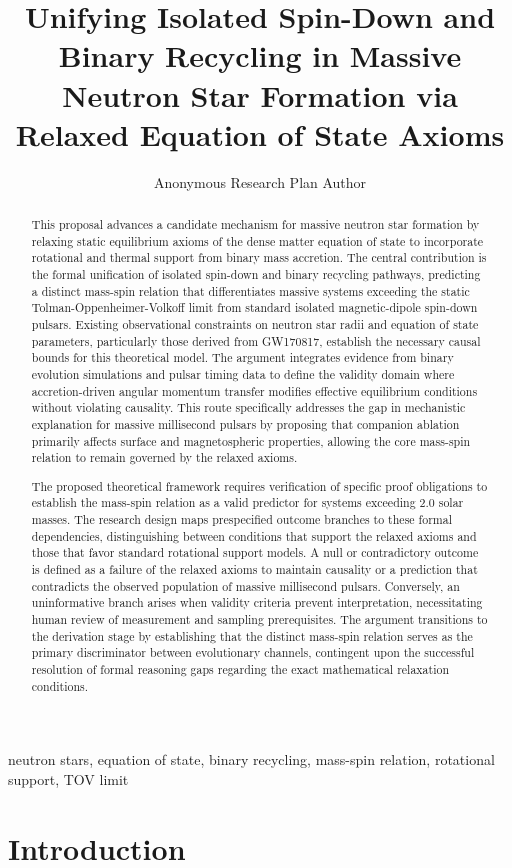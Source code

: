 \documentclass[conference]{IEEEtran}
\begin{document}
\title{Unifying Isolated Spin-Down and Binary Recycling in Massive Neutron Star Formation via Relaxed Equation of State Axioms}\author{Anonymous Research Plan Author}\maketitle

\begin{abstract}
This proposal advances a candidate mechanism for massive neutron star formation by relaxing static equilibrium axioms of the dense matter equation of state to incorporate rotational and thermal support from binary mass accretion. The central contribution is the formal unification of isolated spin-down and binary recycling pathways, predicting a distinct mass-spin relation that differentiates massive systems exceeding the static Tolman-Oppenheimer-Volkoff limit from standard isolated magnetic-dipole spin-down pulsars. Existing observational constraints on neutron star radii and equation of state parameters, particularly those derived from GW170817, establish the necessary causal bounds for this theoretical model. The argument integrates evidence from binary evolution simulations and pulsar timing data to define the validity domain where accretion-driven angular momentum transfer modifies effective equilibrium conditions without violating causality. This route specifically addresses the gap in mechanistic explanation for massive millisecond pulsars by proposing that companion ablation primarily affects surface and magnetospheric properties, allowing the core mass-spin relation to remain governed by the relaxed axioms.

The proposed theoretical framework requires verification of specific proof obligations to establish the mass-spin relation as a valid predictor for systems exceeding 2.0 solar masses. The research design maps prespecified outcome branches to these formal dependencies, distinguishing between conditions that support the relaxed axioms and those that favor standard rotational support models. A null or contradictory outcome is defined as a failure of the relaxed axioms to maintain causality or a prediction that contradicts the observed population of massive millisecond pulsars. Conversely, an uninformative branch arises when validity criteria prevent interpretation, necessitating human review of measurement and sampling prerequisites. The argument transitions to the derivation stage by establishing that the distinct mass-spin relation serves as the primary discriminator between evolutionary channels, contingent upon the successful resolution of formal reasoning gaps regarding the exact mathematical relaxation conditions.
\end{abstract}
\begin{IEEEkeywords}
neutron stars, equation of state, binary recycling, mass-spin relation, rotational support, TOV limit
\end{IEEEkeywords}\section{Introduction}
\end{document}
